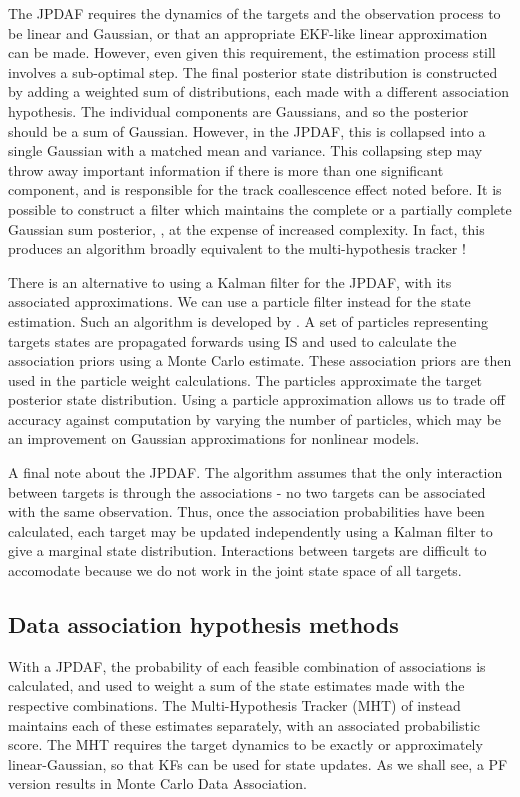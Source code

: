 The JPDAF requires the dynamics of the targets and the observation process to be linear and Gaussian, or that an appropriate EKF-like linear approximation can be made. However, even given this requirement, the estimation process still involves a sub-optimal step. The final posterior state distribution is constructed by adding a weighted sum of distributions, each made with a different association hypothesis. The individual components are Gaussians, and so the posterior should be a sum of Gaussian. However, in the JPDAF, this is collapsed into a single Gaussian with a matched mean and variance. This collapsing step may throw away important information if there is more than one significant component, and is responsible for the track coallescence effect noted before. It is possible to construct a filter which maintains the complete or a partially complete Gaussian sum posterior, \cite{Singer1974,Salmond1990}, at the expense of increased complexity. In fact, this produces an algorithm broadly equivalent to the multi-hypothesis tracker \cite{Blackman2004}!

There is an alternative to using a Kalman filter for the JPDAF, with its associated approximations. We can use a particle filter instead for the state estimation. Such an algorithm is developed by \cite{Schulz2001,Karlsson2001,Vermaak2005}. A set of particles representing targets states are propagated forwards using IS and used to calculate the association priors using a Monte Carlo estimate. These association priors are then used in the particle weight calculations. The particles approximate the target posterior state distribution. Using a particle approximation allows us to trade off accuracy against computation by varying the number of particles, which may be an improvement on Gaussian approximations for nonlinear models.

A final note about the JPDAF. The algorithm assumes that the only interaction between targets is through the associations - no two targets can be associated with the same observation. Thus, once the association probabilities have been calculated, each target may be updated independently using a Kalman filter to give a marginal state distribution. Interactions between targets are difficult to accomodate because we do not work in the joint state space of all targets.



\subsection{Data association hypothesis methods}
With a JPDAF, the probability of each feasible combination of associations is calculated, and used to weight a sum of the state estimates made with the respective combinations. The Multi-Hypothesis Tracker (MHT) of \cite{Reid1979} instead maintains each of these estimates separately, with an associated probabilistic score. The MHT requires the target dynamics to be exactly or approximately linear-Gaussian, so that KFs can be used for state updates. As we shall see, a PF version results in Monte Carlo Data Association.

